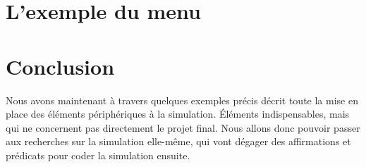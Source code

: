 \section{L'exemple du menu}
  
  
\section{Conclusion}
  Nous avons maintenant à travers quelques exemples précis décrit toute la mise en place des éléments périphériques à la simulation. Éléments indispensables, mais qui ne concernent pas directement le projet final. Nous allons donc pouvoir passer aux recherches sur la simulation elle-même, qui vont dégager des affirmations et prédicats pour coder la simulation ensuite.

    
     
